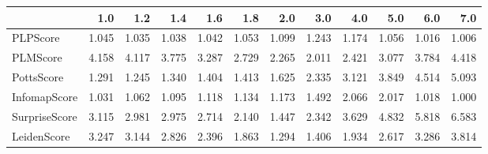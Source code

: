 \begin{tabular}{lrrrrrrrrrrr}
\toprule
{} &   1.0 &   1.2 &   1.4 &   1.6 &   1.8 &   2.0 &   3.0 &   4.0 &   5.0 &   6.0 &   7.0 \\
\midrule
PLPScore      & 1.045 & 1.035 & 1.038 & 1.042 & 1.053 & 1.099 & 1.243 & 1.174 & 1.056 & 1.016 & 1.006 \\
PLMScore      & 4.158 & 4.117 & 3.775 & 3.287 & 2.729 & 2.265 & 2.011 & 2.421 & 3.077 & 3.784 & 4.418 \\
PottsScore    & 1.291 & 1.245 & 1.340 & 1.404 & 1.413 & 1.625 & 2.335 & 3.121 & 3.849 & 4.514 & 5.093 \\
InfomapScore  & 1.031 & 1.062 & 1.095 & 1.118 & 1.134 & 1.173 & 1.492 & 2.066 & 2.017 & 1.018 & 1.000 \\
SurpriseScore & 3.115 & 2.981 & 2.975 & 2.714 & 2.140 & 1.447 & 2.342 & 3.629 & 4.832 & 5.818 & 6.583 \\
LeidenScore   & 3.247 & 3.144 & 2.826 & 2.396 & 1.863 & 1.294 & 1.406 & 1.934 & 2.617 & 3.286 & 3.814 \\
\bottomrule
\end{tabular}

